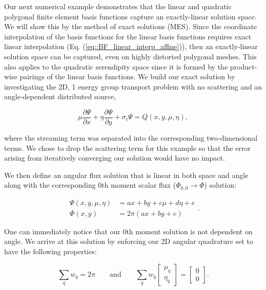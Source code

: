 Our next numerical example demonstrates that the linear and quadratic polygonal finite element basis functions capture an exactly-linear solution space. We will show this by the method of exact solutions (MES). Since the coordinate interpolation of the basis functions for the linear basis functions requires exact linear interpolation (Eq. (\ref{eq::BF_linear_interp_affine})), then an exactly-linear solution space can be captured, even on highly distorted polygonal meshes. This also applies to the quadratic serendipity space since it is formed by the product-wise pairings of the linear basis functions. We build our exact solution by investigating the 2D, 1 energy group transport problem with no scattering and an angle-dependent distributed source,

\begin{equation}
\label{eq::BF_Results_Linear_angflux}
\mu \frac{\partial \Psi}{\partial x} + \eta \frac{\partial \Psi}{\partial y} + \sigma_t \Psi = Q(x,y, \mu, \eta), 
\end{equation}

\noindent where the streaming term was separated into the corresponding two-dimensional terms. We chose to drop the scattering term for this example so that the error arising from iteratively converging our solution would have no impact.

We then define an angular flux solution that is linear in both space and angle along with the corresponding 0th moment scalar flux ($\Phi_{0,0} \rightarrow \Phi$) solution:

\begin{equation}
\label{eq::BF_Results_Linear_fluxsols}
\begin{aligned}
\Psi (x,y,\mu,\eta) &= ax + by + c \mu + d\eta + e\\
\Phi (x,y) &= 2 \pi \left( ax + by  + e \right)
\end{aligned} .
\end{equation}

\noindent One can immediately notice that our 0th moment solution is not dependent on angle. We arrive at this solution by enforcing our 2D angular quadrature set to have the following properties:

\begin{equation}
\label{eq::BF_Results_Linear_quadrules}
\sum_{q} w_q = 2 \pi \qquad \text{and} \qquad \sum_{q} w_q  \left[
	\begin{array}{c}
		\mu_q \\
		\eta_q
	\end{array} \right] = \left[
	\begin{array}{c}
		0 \\
		0
	\end{array} \right] .
\end{equation}

